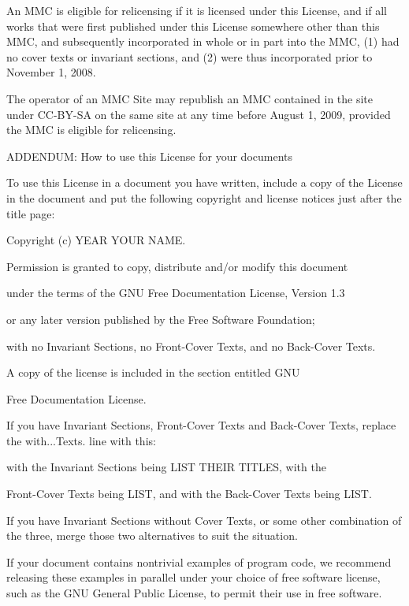 An MMC is \textquotedbl{}eligible for relicensing\textquotedbl{} if
it is licensed under this License, and if all works that were first
published under this License somewhere other than this MMC, and subsequently
incorporated in whole or in part into the MMC, (1) had no cover texts
or invariant sections, and (2) were thus incorporated prior to November
1, 2008.

The operator of an MMC Site may republish an MMC contained in the
site under CC-BY-SA on the same site at any time before August 1,
2009, provided the MMC is eligible for relicensing.

ADDENDUM: How to use this License for your documents

To use this License in a document you have written, include a copy
of the License in the document and put the following copyright and
license notices just after the title page:

Copyright (c) YEAR YOUR NAME.

Permission is granted to copy, distribute and/or modify this document

under the terms of the GNU Free Documentation License, Version 1.3

or any later version published by the Free Software Foundation;

with no Invariant Sections, no Front-Cover Texts, and no Back-Cover
Texts.

A copy of the license is included in the section entitled \textquotedbl{}GNU

Free Documentation License\textquotedbl{}.

If you have Invariant Sections, Front-Cover Texts and Back-Cover Texts,
replace the \textquotedbl{}with...Texts.\textquotedbl{} line with
this:

with the Invariant Sections being LIST THEIR TITLES, with the

Front-Cover Texts being LIST, and with the Back-Cover Texts being
LIST.

If you have Invariant Sections without Cover Texts, or some other
combination of the three, merge those two alternatives to suit the
situation.

If your document contains nontrivial examples of program code, we
recommend releasing these examples in parallel under your choice of
free software license, such as the GNU General Public License, to
permit their use in free software. 
